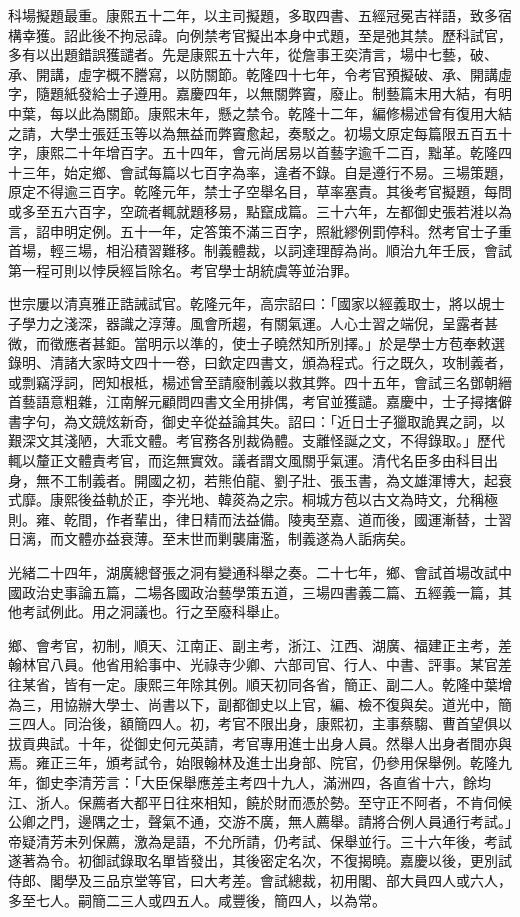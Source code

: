 \begin{pinyinscope}
科場擬題最重。康熙五十二年，以主司擬題，多取四書、五經冠冕吉祥語，致多宿構幸獲。詔此後不拘忌諱。向例禁考官擬出本身中式題，至是弛其禁。歷科試官，多有以出題錯誤獲譴者。先是康熙五十六年，從詹事王奕清言，場中七藝，破、承、開講，虛字概不謄寫，以防關節。乾隆四十七年，令考官預擬破、承、開講虛字，隨題紙發給士子遵用。嘉慶四年，以無關弊竇，廢止。制藝篇末用大結，有明中葉，每以此為關節。康熙末年，懸之禁令。乾隆十二年，編修楊述曾有復用大結之請，大學士張廷玉等以為無益而弊竇愈起，奏駁之。初場文原定每篇限五百五十字，康熙二十年增百字。五十四年，會元尚居易以首藝字逾千二百，黜革。乾隆四十三年，始定鄉、會試每篇以七百字為率，違者不錄。自是遵行不易。三場策題，原定不得逾三百字。乾隆元年，禁士子空舉名目，草率塞責。其後考官擬題，每問或多至五六百字，空疏者輒就題移易，點竄成篇。三十六年，左都御史張若溎以為言，詔申明定例。五十一年，定答策不滿三百字，照紕繆例罰停科。然考官士子重首場，輕三場，相沿積習難移。制義體裁，以詞達理醇為尚。順治九年壬辰，會試第一程可則以悖戾經旨除名。考官學士胡統虞等並治罪。

世宗屢以清真雅正誥誡試官。乾隆元年，高宗詔曰：「國家以經義取士，將以覘士子學力之淺深，器識之淳薄。風會所趨，有關氣運。人心士習之端倪，呈露者甚微，而徵應者甚鉅。當明示以準的，使士子曉然知所別擇。」於是學士方苞奉敕選錄明、清諸大家時文四十一卷，曰欽定四書文，頒為程式。行之既久，攻制義者，或剽竊浮詞，罔知根柢，楊述曾至請廢制義以救其弊。四十五年，會試三名鄧朝縉首藝語意粗雜，江南解元顧問四書文全用排偶，考官並獲譴。嘉慶中，士子撏撦僻書字句，為文競炫新奇，御史辛從益論其失。詔曰：「近日士子獵取詭異之詞，以艱深文其淺陋，大乖文體。考官務各別裁偽體。支離怪誕之文，不得錄取。」歷代輒以釐正文體責考官，而迄無實效。議者謂文風關乎氣運。清代名臣多由科目出身，無不工制義者。開國之初，若熊伯龍、劉子壯、張玉書，為文雄渾博大，起衰式靡。康熙後益軌於正，李光地、韓菼為之宗。桐城方苞以古文為時文，允稱極則。雍、乾間，作者輩出，律日精而法益備。陵夷至嘉、道而後，國運漸替，士習日漓，而文體亦益衰薄。至末世而剿襲庸濫，制義遂為人詬病矣。

光緒二十四年，湖廣總督張之洞有變通科舉之奏。二十七年，鄉、會試首場改試中國政治史事論五篇，二場各國政治藝學策五道，三場四書義二篇、五經義一篇，其他考試例此。用之洞議也。行之至廢科舉止。

鄉、會考官，初制，順天、江南正、副主考，浙江、江西、湖廣、福建正主考，差翰林官八員。他省用給事中、光祿寺少卿、六部司官、行人、中書、評事。某官差往某省，皆有一定。康熙三年除其例。順天初同各省，簡正、副二人。乾隆中葉增為三，用協辦大學士、尚書以下，副都御史以上官，編、檢不復與矣。道光中，簡三四人。同治後，額簡四人。初，考官不限出身，康熙初，主事蔡騶、曹首望俱以拔貢典試。十年，從御史何元英請，考官專用進士出身人員。然舉人出身者間亦與焉。雍正三年，頒考試令，始限翰林及進士出身部、院官，仍參用保舉例。乾隆九年，御史李清芳言：「大臣保舉應差主考四十九人，滿洲四，各直省十六，餘均江、浙人。保薦者大都平日往來相知，饒於財而憑於勢。至守正不阿者，不肯伺候公卿之門，邊隅之士，聲氣不通，交游不廣，無人薦舉。請將合例人員通行考試。」帝疑清芳未列保薦，激為是語，不允所請，仍考試、保舉並行。三十六年後，考試遂著為令。初御試錄取名單皆發出，其後密定名次，不復揭曉。嘉慶以後，更別試侍郎、閣學及三品京堂等官，曰大考差。會試總裁，初用閣、部大員四人或六人，多至七人。嗣簡二三人或四五人。咸豐後，簡四人，以為常。


\end{pinyinscope}
